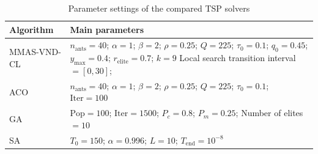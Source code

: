 \documentclass[lettersize,journal]{IEEEtran}
\begin{document}
\begin{table}[!t]
\caption{Parameter settings of the compared TSP solvers}
\label{tab:tsp_params}
\centering
\scriptsize
\begin{tabular}{>{\centering\arraybackslash}m{} m{}}
\toprule
Algorithm & Main parameters \\
\midrule
MMAS-VND-CL & $n_{\mathrm{ants}}=40$;
$\alpha=1$;
$\beta=2$;\newline
$\rho=0.25$;
$Q=225$;
$\tau_0=0.1$;\newline
$q_0=0.45$;
$y_{\max}=0.4$;\newline
$r_{\mathrm{elite}}=0.7$;
$k=9$ \newline
Local search transition interval$=[0,30]$;\\
\midrule
ACO & $n_{\mathrm{ants}}=40$;
$\alpha=1$;
$\beta=2$;
$\rho=0.25$;\newline
$Q=225$;
$\tau_0=0.1$;
$\mathrm{Iter}=100$ \\
\midrule
GA & $\mathrm{Pop}=100$;
$\mathrm{Iter}=1500$;\newline
$P_c=0.8$;
$P_m=0.25$;\newline
Number of elites$=10$ \\
\midrule
SA & $T_0=150$;
$\alpha=0.996$;\newline
$L=10$;
$T_{\mathrm{end}}=10^{-8}$ \\
\bottomrule
\end{tabular}
\end{table}
\end{document}

